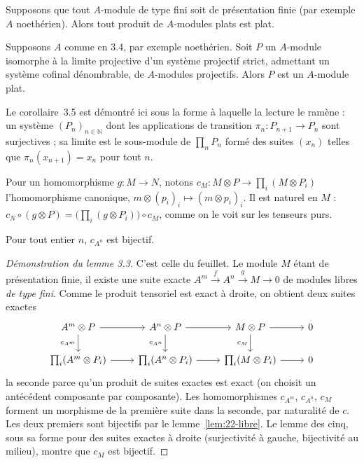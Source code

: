 \begin{enonce}
Supposons que tout $A$-module de type fini soit de présentation finie (par exemple $A$ noethérien). Alors tout produit de $A$-modules plats est plat.
\end{enonce}

\begin{enonce}[Corollaire 3.5]
Supposons $A$ comme en 3.4, par exemple noethérien. Soit $P$ un $A$-module isomorphe à la limite projective d'un système projectif strict, admettant un système cofinal dénombrable, de $A$-modules projectifs. Alors $P$ est un $A$-module plat.
\end{enonce}

\noindent Le corollaire~3.5 est démontré ici sous la forme à laquelle la lecture le ramène : un système $(P_n)_{n \in \mathbb N}$ dont les applications de transition $\pi_n : P_{n+1} \to P_n$ sont surjectives ; sa limite est le sous-module de $\prod_n P_n$ formé des suites $(x_n)$ telles que $\pi_n(x_{n+1}) = x_n$ pour tout $n$.

Pour un homomorphisme $g : M \to N$, notons $c_M : M \otimes P \to \prod_i (M \otimes P_i)$ l'homomorphisme canonique, $m \otimes (p_i)_i \mapsto (m \otimes p_i)_i$. Il est naturel en $M$ : $c_N \circ (g \otimes P) = \bigl(\prod_i (g \otimes P_i)\bigr) \circ c_M$, comme on le voit sur les tenseurs purs.

\begin{lemme}\label{lem:22-libre}
Pour tout entier $n$, $c_{A^n}$ est bijectif.
\end{lemme}


\begin{proof}[Démonstration du lemme 3.3]
C'est celle du feuillet. Le module $M$ étant de présentation finie, il existe une suite exacte $A^m \xrightarrow{f} A^n \xrightarrow{g} M \to 0$ de modules libres \emph{de type fini}. Comme le produit tensoriel est exact à droite, on obtient deux suites exactes
\[
\begin{tikzcd}
A^m \otimes P \arrow[r] \arrow[d, "c_{A^m}"'] & A^n \otimes P \arrow[r] \arrow[d, "c_{A^n}"'] & M \otimes P \arrow[r] \arrow[d, "c_M"'] & 0 \\
\prod_i (A^m \otimes P_i) \arrow[r] & \prod_i (A^n \otimes P_i) \arrow[r] & \prod_i (M \otimes P_i) \arrow[r] & 0
\end{tikzcd}
\]
la seconde parce qu'un produit de suites exactes est exact (on choisit un antécédent composante par composante). Les homomorphismes $c_{A^m}$, $c_{A^n}$, $c_M$ forment un morphisme de la première suite dans la seconde, par naturalité de $c$. Les deux premiers sont bijectifs par le lemme~\ref{lem:22-libre}. Le lemme des cinq, sous sa forme pour des suites exactes à droite (surjectivité à gauche, bijectivité au milieu), montre que $c_M$ est bijectif.
\end{proof}

